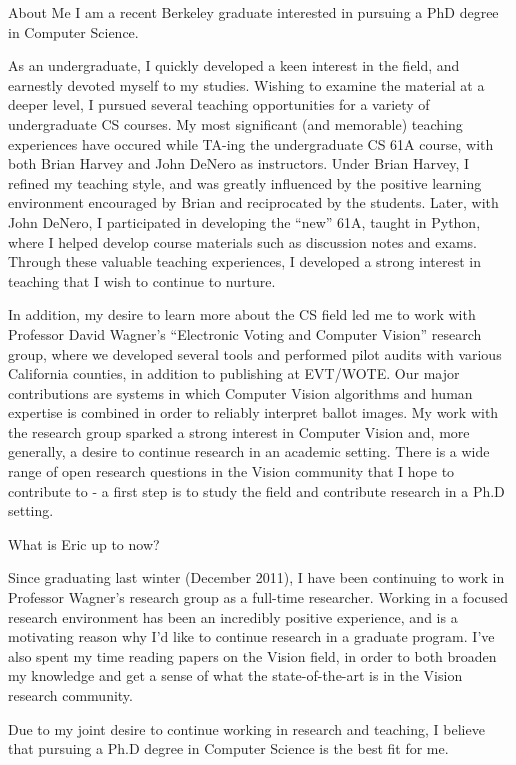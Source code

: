 \documentclass{resume}
\begin{document}
\maketitle
\thispagestyle{empty} %

\begin{component}{About Me}
I am a recent Berkeley graduate interested in pursuing a PhD degree in Computer 
Science.

As an undergraduate, I quickly developed a keen interest in the field, 
and earnestly devoted myself to my studies. Wishing to examine the 
material at a deeper level, I pursued several 
teaching opportunities for a variety of undergraduate CS courses. My
most significant (and memorable) teaching experiences have occured while 
TA-ing the undergraduate CS 61A course, with both Brian Harvey and John
DeNero as instructors. Under Brian Harvey, I refined my teaching style, and
was greatly influenced by the positive learning environment encouraged by
Brian and reciprocated by the students. Later, with John DeNero, I participated
in developing the ``new'' 61A, taught in Python, where I helped develop
course materials such as discussion notes and exams.
Through these valuable teaching 
experiences, I developed a strong interest in teaching that I wish to
continue to nurture.

In addition, my desire to learn more about the CS field led me to
work with Professor David Wagner's ``Electronic Voting and Computer Vision''
research group, where we developed several tools and performed pilot audits
with various California counties, in addition to publishing at EVT/WOTE. Our major
contributions are systems in which Computer Vision algorithms and human
expertise is combined in order to reliably interpret ballot images. 
My work with
the research group sparked a strong interest in Computer 
Vision and, more generally, a desire to continue research in an
academic setting. There is a wide range of open research questions in the
Vision community that I hope to contribute to - a first step is to study the
field and contribute research in a Ph.D setting.
\end{component}

\begin{component}{What is Eric up to now?}

Since graduating last winter (December 2011), I have been continuing to work
in Professor Wagner's research group as a full-time researcher. Working in a
focused research environment has been an incredibly positive experience, and
is a motivating reason why I'd like to continue research in a graduate program. I've also
spent my time reading papers on the Vision field, in order to both broaden my
knowledge and get a sense of what the state-of-the-art is in the Vision
research community.

Due to my joint desire to continue working in research and teaching, I believe that pursuing
a Ph.D degree in Computer Science is the best fit for me.
\end{component}
\end{document}
